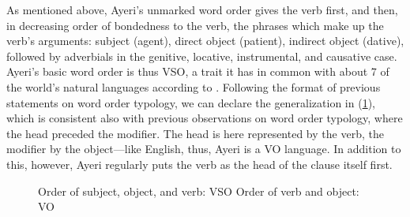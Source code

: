 As mentioned above, Ayeri's unmarked word order gives the verb first, and then,
in decreasing order of bondedness to the verb, the phrases which make up the
verb's arguments: subject (agent), direct object (patient), indirect object
(dative), followed by adverbials in the genitive, locative, instrumental, and
causative case. Ayeri's basic word order is thus VSO, a trait it has in common
with about 7\pct{} of the world's natural languages according to
\citet{wals81}.
Following the format of previous statements on word order typology, we can
declare the generalization in (\ref{ex:constordertypo}), which is consistent
also with previous observations on word order typology, where the head preceded
the modifier. The head is here represented by the verb, the modifier by the
object---like English, thus, Ayeri is a VO language. In addition to this,
however, Ayeri regularly puts the verb as the head of the clause itself first.

\begin{figure}[h]
\pex\label{ex:constordertypo}
\a Order of subject, object, and verb: VSO
\a Order of verb and object: VO
\xe
\end{figure}




